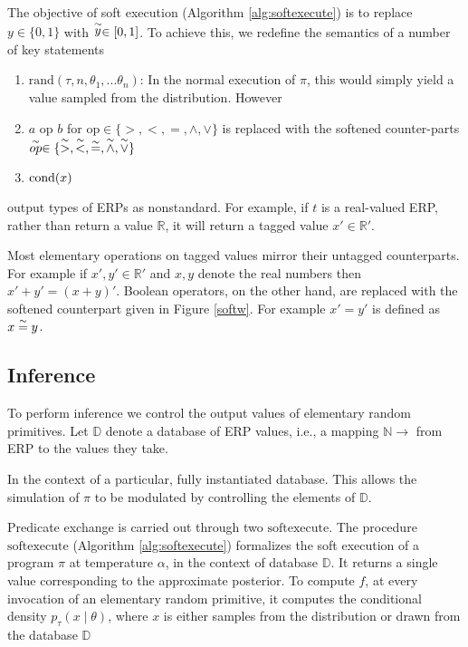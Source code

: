 The objective of soft execution (Algorithm \ref{alg:softexecute}) is to replace  $y \in \{0,1\}$ with $\stackrel{\sim}{y} \in [0, 1]$.
To achieve this, we redefine the semantics of a number of key statements

\begin{enumerate}
  \item $\textrm{rand}(\tau, n, \theta_1, ...\theta_n)$: In the normal execution of $\pi$, this would simply yield a value sampled from the distribution.  However
  \item $a \text{ op } b$ for $\textrm{op} \in \{>, <, =, \land, \lor\}$ is replaced with the softened counter-parts $\stackrel{\sim}{op} \in \{\stackrel{\sim}{>}, \stackrel{\sim}{<}, \stackrel{\sim}{=}, \stackrel{\sim}{\land}, \stackrel{\sim}{\lor}\}$
  \item $\operatorname{cond}(x)$
\end{enumerate}

output types of ERPs as nonstandard.
For example, if $t$ is a real-valued ERP, rather than return a value $\mathbb{R}$, it will return a tagged value $x' \in \mathbb{R}'$.

Most elementary operations on tagged values mirror their untagged counterparts.
For example if $x', y' \in \mathbb{R}'$ and $x, y$ denote the real numbers then $x'+ y' = (x + y)'$.
Boolean operators, on the other hand, are replaced with the softened counterpart given in Figure \ref{softw}.
For example $x' = y'$ is defined as $x \stackrel{\sim}{=} y$.


\subsection{Inference}

To perform inference we control the output values of elementary random primitives.
Let $\mathbb{D}$ denote a database of ERP values, i.e., a mapping $\mathbb{N } \to $ from ERP to the values they take. 

In the context of a particular, fully instantiated database.
This allows the simulation of $\pi$ to be modulated by controlling the elements of $\mathbb{D}$.

Predicate exchange is carried out through two $\textrm{softexecute}$.
The procedure $\textrm{softexecute}$ (Algorithm \ref{alg:softexecute}) formalizes the soft execution of a program $\pi$ at temperature $\alpha$, in the context of database $\mathbb{D}$.
It returns a single value corresponding to the approximate posterior.
To compute $f$, at every invocation of an elementary random primitive, it computes the conditional density $p_\tau(x \mid \theta)$, where $x$ is either samples from the distribution or drawn from the database $\mathbb{D}$

